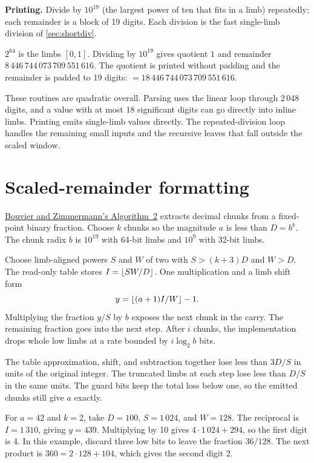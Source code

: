 \textbf{Printing.} Divide by $10^{19}$ (the largest power of ten that fits in a limb) repeatedly;
each remainder is a block of 19 digits. Each division is the fast single-limb division of
\cref{sec:shortdiv}.

\begin{example}[: printing $2^{64}$]
$2^{64}$ is the limbs $[0, 1]$. Dividing by $10^{19}$ gives quotient $1$ and remainder
$8\,446\,744\,073\,709\,551\,616$. The quotient is printed without padding and the remainder is
padded to 19 digits:  $= 18\,446\,744\,073\,709\,551\,616$.
\end{example}

These routines are quadratic overall. Parsing uses the linear loop through 2\,048 digits,
and a value with at most 18 significant digits can go directly into inline limbs.
Printing emits single-limb values directly. The repeated-division loop handles the
remaining small inputs and the recursive leaves that fall outside the scaled window.

\section{Scaled-remainder formatting}
\label{sec:scaledformat}

\href{https://members.loria.fr/PZimmermann/papers/get_str.pdf}{Bouvier and Zimmermann's Algorithm~2}
extracts decimal chunks from a fixed-point binary fraction. Choose $k$ chunks
so the magnitude $a$ is less than $D=b^k$. The chunk radix $b$ is $10^{19}$
with 64-bit limbs and $10^9$ with 32-bit limbs.

Choose limb-aligned powers $S$ and $W$ of two with $S>(k+3)D$ and $W>D$.
The read-only table stores $I=\left\lfloor SW/D \right\rfloor$. One multiplication and a limb
shift form
\[
y=\left\lfloor (a+1)I/W \right\rfloor-1.
\]
Multiplying the fraction $y/S$ by $b$ exposes the next chunk in the carry.
The remaining fraction goes into the next step. After $i$ chunks, the
implementation drops whole low limbs at a rate bounded by $i\log_2 b$ bits.

The table approximation, shift, and subtraction together lose less than
$3D/S$ in units of the original integer. The truncated limbs at each
step lose less than $D/S$ in the same units. The guard bits keep the
total loss below one, so the emitted chunks still give $a$ exactly.

\begin{example}[ in radix 10]
For $a=42$ and $k=2$, take $D=100$, $S=1\,024$, and $W=128$.
The reciprocal is $I=1\,310$, giving $y=439$.
Multiplying by 10 gives $4\cdot1\,024+294$, so the first digit is 4.
In this example, discard three low bits to leave the fraction $36/128$.
The next product is $360=2\cdot128+104$, which gives the second digit 2.
\end{example}

